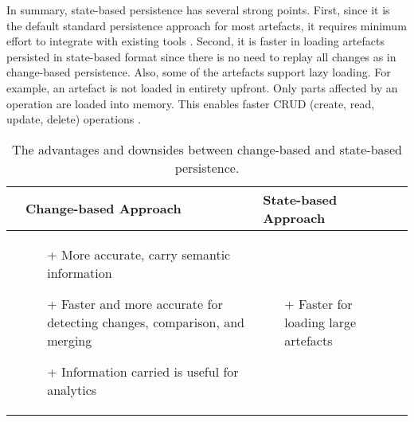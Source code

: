 In summary, state-based persistence has several strong points. First, since it is the default standard persistence approach for most artefacts, it requires minimum effort to integrate with existing tools \cite{koegel2010emfstore}. Second, it is faster in loading artefacts persisted in state-based format since there is no need to replay all changes as in change-based persistence. Also, some of the artefacts support lazy loading. For example, an artefact is not loaded in entirety upfront. Only parts affected by an operation are loaded into memory. This enables faster CRUD (create, read, update, delete) operations \cite{DBLP:conf/models/Espinazo-PaganCM11,daniel2016neoemf}. 

\begin{table*}[h]
  \centering
  \caption{The advantages and downsides between change-based and state-based persistence.}
  \label{table:advantages_drawbacks}
\begin{scriptsize}
    \begin{tabular}
      {|>{\centering\arraybackslash}p{1.1cm}|>{\centering\arraybackslash}p{1.1cm}|>{\centering\arraybackslash}p{5cm}|>{\centering\arraybackslash}p{5cm}|}
      \hline 
      \multicolumn{2}{|c|}{\textbf{Dimensions}}&\textbf{Change-based Approach}&\textbf{State-based Approach}\\
      \hline 
      \multicolumn{2}{|p{2.2cm}|}{\centering Advantages} &
      \begin{minipage}[t]{5cm}
        \begin{itemize}[leftmargin=9pt]
          \setlength\itemsep{2pt}
          \item[+] More accurate, carry semantic information \cite{DBLP:journals/entcs/RobbesL07,DBLP:conf/sde/LippeO92,DBLP:conf/caise/IgnatN05,mens2002state}  
          \item[+] Faster and more accurate for detecting changes, comparison, and merging \cite{DBLP:conf/sde/LippeO92,DBLP:conf/caise/IgnatN05,koegel2010emfstore}
          \item[+] Information carried is useful for analytics \cite{DBLP:journals/entcs/RobbesL07}
        \end{itemize}
      \end{minipage}
      & 
      \begin{minipage}[t]{5cm}
        \raggedright
        \begin{itemize}[leftmargin=9pt]
          \setlength\itemsep{2pt}
          \item[+] Faster for loading large artefacts \cite{DBLP:conf/models/Espinazo-PaganCM11,daniel2016neoemf,eclipse2019cdo}

\end{itemize}
\end{minipage}
\end{tabular}
\end{scriptsize}
\end{table*}
